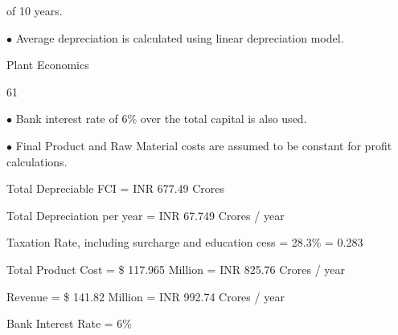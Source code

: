 \documentclass[a4paper,portrait,12pt]{article}
\begin{document}
\begin{flushleft}
of 10 years.
\end{flushleft}


\begin{flushleft}
$\bullet$ Average depreciation is calculated using linear depreciation model.
\end{flushleft}





\begin{flushleft}
\newpage
Plant Economics
\end{flushleft}





61





\begin{flushleft}
$\bullet$ Bank interest rate of 6\% over the total capital is also used.
\end{flushleft}


\begin{flushleft}
$\bullet$ Final Product and Raw Material costs are assumed to be constant for profit calculations.
\end{flushleft}


\begin{flushleft}
Total Depreciable FCI = INR 677.49 Crores
\end{flushleft}


\begin{flushleft}
Total Depreciation per year = INR 67.749 Crores / year
\end{flushleft}


\begin{flushleft}
Taxation Rate, including surcharge and education cess = 28.3\% = 0.283
\end{flushleft}


\begin{flushleft}
Total Product Cost = \$ 117.965 Million = INR 825.76 Crores / year
\end{flushleft}


\begin{flushleft}
Revenue = \$ 141.82 Million = INR 992.74 Crores / year
\end{flushleft}


\begin{flushleft}
Bank Interest Rate = 6\%
\end{flushleft}
\end{document}
